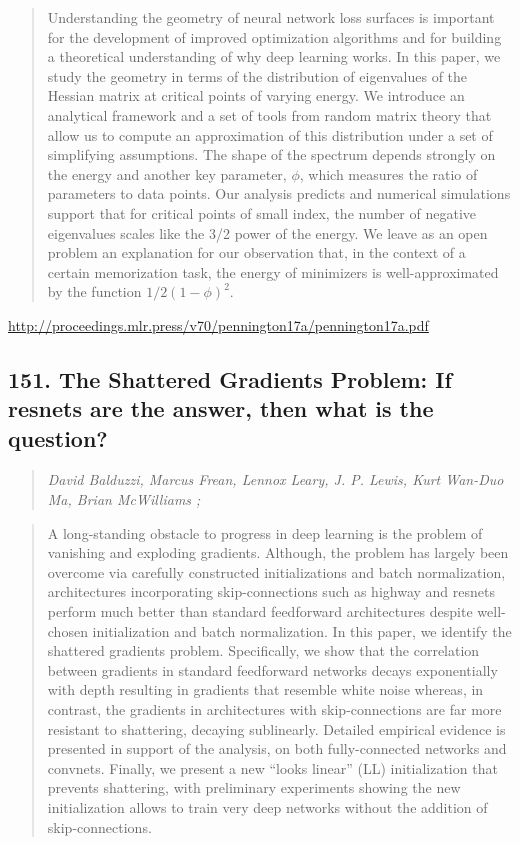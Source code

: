 \documentclass{article}
\begin{document}
\begin{quote}
    Understanding the geometry of neural network loss surfaces is important for the development of improved optimization algorithms and for building a theoretical understanding of why deep learning works. In this paper, we study the geometry in terms of the distribution of eigenvalues of the Hessian matrix at critical points of varying energy. We introduce an analytical framework and a set of tools from random matrix theory that allow us to compute an approximation of this distribution under a set of simplifying assumptions. The shape of the spectrum depends strongly on the energy and another key parameter, $\phi$, which measures the ratio of parameters to data points. Our analysis predicts and numerical simulations support that for critical points of small index, the number of negative eigenvalues scales like the 3/2 power of the energy. We leave as an open problem an explanation for our observation that, in the context of a certain memorization task, the energy of minimizers is well-approximated by the function $1/2(1-\phi)^2$.  \end{quote}

\href{http://proceedings.mlr.press/v70/pennington17a/pennington17a.pdf}{http://proceedings.mlr.press/v70/pennington17a/pennington17a.pdf}

\subsection{151. The Shattered Gradients Problem: If resnets are the answer, then what is the question?}

\begin{quote}
\footnotesize{\textit{David Balduzzi, Marcus Frean, Lennox Leary, J. P. Lewis, Kurt Wan-Duo Ma, Brian McWilliams ;}}
\end{quote}

\begin{quote}
    A long-standing obstacle to progress in deep learning is the problem of vanishing and exploding gradients. Although, the problem has largely been overcome via carefully constructed initializations and batch normalization, architectures incorporating skip-connections such as highway and resnets perform much better than standard feedforward architectures despite well-chosen initialization and batch normalization. In this paper, we identify the shattered gradients problem. Specifically, we show that the correlation between gradients in standard feedforward networks decays exponentially with depth resulting in gradients that resemble white noise whereas, in contrast, the gradients in architectures with skip-connections are far more resistant to shattering, decaying sublinearly. Detailed empirical evidence is presented in support of the analysis, on both fully-connected networks and convnets. Finally, we present a new “looks linear” (LL) initialization that prevents shattering, with preliminary experiments showing the new initialization allows to train very deep networks without the addition of skip-connections.  \end{quote}
\end{document}
